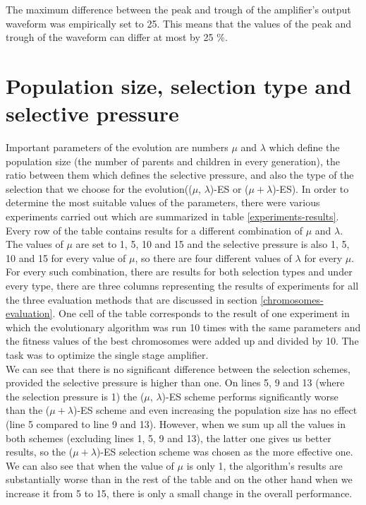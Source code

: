 The maximum difference between the peak and trough of the amplifier's output waveform was empirically set to 25. This means that the values of the peak and trough of the waveform can differ at most by 25 \%.

\section{Population size, selection type and selective pressure}
Important parameters of the evolution are numbers $\mu$ and $\lambda$ which define the population size (the number of parents and children in every generation), the ratio between them which defines the selective pressure, and also the type of the selection that we choose for the evolution(($\mu$, $\lambda$)-ES or ($\mu + \lambda$)-ES). In order to determine the most suitable values of the parameters, there were various experiments carried out which are summarized in table \ref{experiments-results}.\\
Every row of the table contains results for a different combination of $\mu$ and $\lambda$. The values of $\mu$ are set to 1, 5, 10 and 15 and the selective pressure is also 1, 5, 10 and 15 for every value of $\mu$, so there are four different values of $\lambda$ for every $\mu$. For every such combination, there are results for both selection types and under every type, there are three columns representing the results of experiments for all the three evaluation methods that are discussed in section \ref{chromosomes-evaluation}. One cell of the table corresponds to the result of one experiment in which the evolutionary algorithm was run 10 times with the same parameters and the fitness values of the best chromosomes were added up and divided by 10. The task was to optimize the single stage amplifier.\\
We can see that there is no significant difference between the selection schemes, provided the selective pressure is higher than one. On lines 5, 9 and 13 (where the selection pressure is 1) the ($\mu$, $\lambda$)-ES scheme performs significantly worse than the ($\mu + \lambda$)-ES scheme and even increasing the population size has no effect (line 5 compared to line 9 and 13). However, when we sum up all the values in both schemes (excluding lines 1, 5, 9 and 13), the latter one gives us better results, so the ($\mu + \lambda$)-ES selection scheme was chosen as the more effective one.\\
We can also see that when the value of $\mu$ is only 1, the algorithm's results are substantially worse than in the rest of the table and on the other hand when we increase it from 5 to 15, there is only a small change in the overall performance.\\
